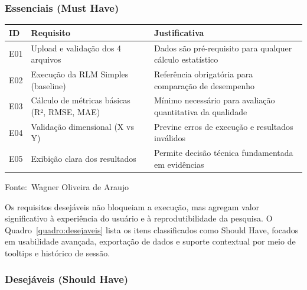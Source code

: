 \documentclass[12pt,a4paper]{article}
\newcommand{\oautor}{Wagner Oliveira de Araujo}
\begin{document}
\subsubsection{Essenciais (Must Have)}

\begin{quadro}[ht]
\centering
\small
\caption{Requisitos essenciais do sistema (Must Have)}
\label{quadro:essenciais}
\begin{threeparttable}
\begin{tabularx}{\textwidth}{|l|X|X|} \hline
\textbf{ID} & \textbf{Requisito} & \textbf{Justificativa} \\ \hline
E01 & Upload e validação dos 4 arquivos & Dados são pré-requisito para qualquer cálculo estatístico \\ \hline
E02 & Execução da RLM Simples (baseline) & Referência obrigatória para comparação de desempenho \\ \hline
E03 & Cálculo de métricas básicas (R², RMSE, MAE) & Mínimo necessário para avaliação quantitativa da qualidade \\ \hline
E04 & Validação dimensional (X vs Y) & Previne erros de execução e resultados inválidos \\ \hline
E05 & Exibição clara dos resultados & Permite decisão técnica fundamentada em evidências \\ \hline
\end{tabularx}
\begin{tablenotes}[flushleft]
\footnotesize
\item Fonte:~\oautor
\end{tablenotes}
\end{threeparttable}
\end{quadro}

Os requisitos desejáveis não bloqueiam a execução, mas agregam valor significativo à experiência do usuário e à reprodutibilidade da pesquisa. O Quadro~\ref{quadro:desejaveis} lista os itens classificados como Should Have, focados em usabilidade avançada, exportação de dados e suporte contextual por meio de tooltips e histórico de sessão.

\subsubsection{Desejáveis (Should Have)}
\end{document}

